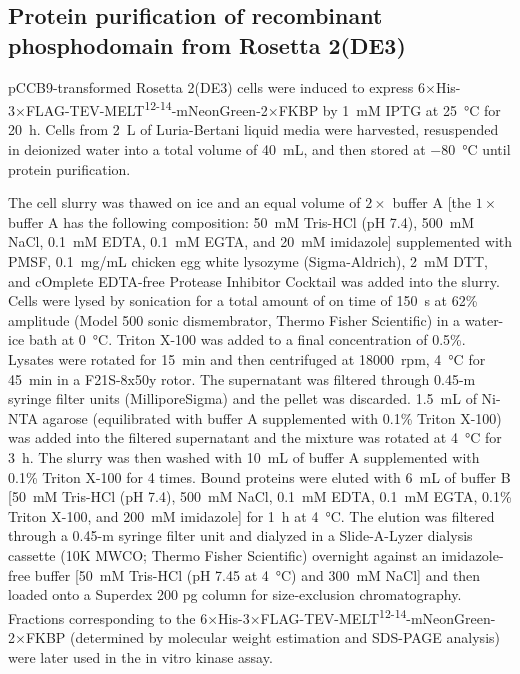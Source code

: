 \subsection*{Protein purification of recombinant  phosphodomain from Rosetta\texttrademark{} 2(DE3)}

pCCB9-transformed Rosetta\texttrademark{} 2(DE3) cells were induced to express 6×His-3×FLAG-TEV-MELT\textsuperscript{12-14}-mNeonGreen-2×FKBP by \SI{1}{mM} IPTG at \SI{25}{\celsius} for \SI{20}{h}. Cells from \SI{2}{L} of Luria-Bertani liquid media were harvested, resuspended in deionized water into a total volume of \SI{40}{mL}, and then stored at \SI{-80}{\celsius} until protein purification.

The cell slurry was thawed on ice and an equal volume of $2\times$ buffer A [the $1\times$ buffer A has the following composition: \SI{50}{mM} Tris-HCl (pH 7.4), \SI{500}{mM} NaCl, \SI{0.1}{mM} EDTA, \SI{0.1}{mM} EGTA, and \SI{20}{mM} imidazole] supplemented with PMSF, \SI{0.1}{mg/mL} chicken egg white lysozyme (Sigma-Aldrich), \SI{2}{mM} DTT, and cOmplete\texttrademark{} EDTA-free Protease Inhibitor Cocktail was added into the slurry. Cells were lysed by sonication for a total amount of on time of \SI{150}{s} at 62\% amplitude (Model 500 sonic dismembrator, Thermo Fisher Scientific) in a water-ice bath at \SI{0}{\celsius}. Triton X-100 was added to a final concentration of 0.5\%. Lysates were rotated for \SI{15}{min} and then centrifuged at \SI{18000}{rpm}, \SI{4}{\celsius} for \SI{45}{min} in a F21S-8x50y rotor. The supernatant was filtered through 0.45-\textmu{}m syringe filter units (MilliporeSigma) and the pellet was discarded. \SI{1.5}{mL} of Ni-NTA agarose (equilibrated with buffer A supplemented with 0.1\% Triton X-100) was added into the filtered supernatant and the mixture was rotated at \SI{4}{\celsius} for \SI{3}{h}. The slurry was then washed with \SI{10}{mL} of buffer A supplemented with 0.1\% Triton X-100 for 4 times. Bound proteins were eluted with \SI{6}{mL} of buffer B [\SI{50}{mM} Tris-HCl (pH 7.4), \SI{500}{mM} NaCl, \SI{0.1}{mM} EDTA, \SI{0.1}{mM} EGTA, 0.1\% Triton X-100, and \SI{200}{mM} imidazole] for \SI{1}{h} at \SI{4}{\celsius}. The elution was filtered through a 0.45-\textmu{}m syringe filter unit and dialyzed in a Slide-A-Lyzer\texttrademark{} dialysis cassette (10K MWCO; Thermo Fisher Scientific) overnight against an imidazole-free buffer [\SI{50}{mM} Tris-HCl (pH 7.45 at \SI{4}{\celsius}) and \SI{300}{mM} NaCl] and then loaded onto a Superdex 200 pg column for size-exclusion chromatography. Fractions corresponding to the 6×His-3×FLAG-TEV-MELT\textsuperscript{12-14}-mNeonGreen-2×FKBP (determined by molecular weight estimation and SDS-PAGE analysis) were later used in the in vitro kinase assay.

